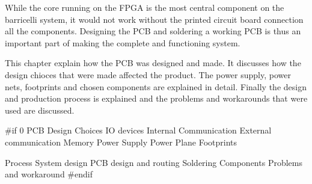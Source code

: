 
While the core running on the FPGA is the most central component on the barricelli system, it would not work without the printed circuit board connection all the components.
Designing the PCB and soldering a working PCB is thus an important part of making the complete and functioning system.

This chapter explain how the PCB was designed and made.
It discusses how the design chioces that were made affected the product.
The power supply, power nets, footprints and chosen components are explained in detail.
Finally the design and production process is explained and the problems and workarounds that were used are discussed.

 \label{pcb:section:design_choices}

 \label{pcb:section:power_supply}

 \label{pcb:section:power_plane}

 \label{pcb:section:footprints}

 \label{pcb:section:process}

 \label{pcb:section:components}

 \label{pcb:section:problems_and_workaround}

#if 0
PCB
    Design Choices
        IO devices
        Internal Communication
        External communication
        Memory
    Power Supply
    Power Plane
    Footprints
        
    Process
        System design
        PCB design and routing
        Soldering
    Components
    Problems and workaround
#endif
